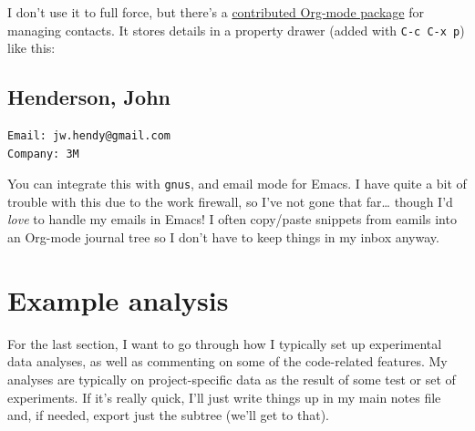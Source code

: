 \documentclass[11pt]{article}
\begin{document}
\begin{center}
\end{center}

I don't use it to full force, but there's a \href{https://julien.danjou.info/projects/emacs-packages#org-contacts}{contributed Org-mode package} for managing
contacts. It stores details in a property drawer (added with \texttt{C-c C-x p}) like this:

\subsection*{Henderson, John}
\label{sec:orgheadline19}
\begin{verbatim}
Email: jw.hendy@gmail.com
Company: 3M
\end{verbatim}

You can integrate this with \texttt{gnus}, and email mode for Emacs. I have quite a bit of
trouble with this due to the work firewall, so I've not gone that far\ldots{} though I'd \emph{love} to
handle my emails in Emacs! I often copy/paste snippets from eamils into an Org-mode
journal tree so I don't have to keep things in my inbox anyway.

\section*{Example analysis}
\label{sec:orgheadline23}

For the last section, I want to go through how I typically set up experimental data
analyses, as well as commenting on some of the code-related features. My analyses are
typically on project-specific data as the result of some test or set of experiments. If
it's really quick, I'll just write things up in my main notes file and, if needed, export
just the subtree (we'll get to that).
\end{document}
